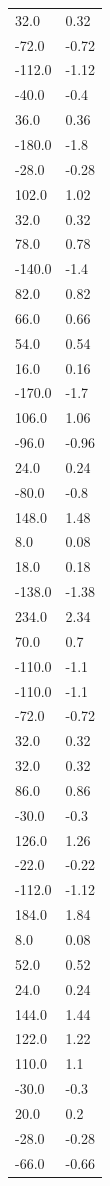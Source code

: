 \begin{longtable}{ll}
32.0 & 0.32 \\
-72.0 & -0.72 \\
-112.0 & -1.12 \\
-40.0 & -0.4 \\
36.0 & 0.36 \\
-180.0 & -1.8 \\
-28.0 & -0.28 \\
102.0 & 1.02 \\
32.0 & 0.32 \\
78.0 & 0.78 \\
-140.0 & -1.4 \\
82.0 & 0.82 \\
66.0 & 0.66 \\
54.0 & 0.54 \\
16.0 & 0.16 \\
-170.0 & -1.7 \\
106.0 & 1.06 \\
-96.0 & -0.96 \\
24.0 & 0.24 \\
-80.0 & -0.8 \\
148.0 & 1.48 \\
8.0 & 0.08 \\
18.0 & 0.18 \\
-138.0 & -1.38 \\
234.0 & 2.34 \\
70.0 & 0.7 \\
-110.0 & -1.1 \\
-110.0 & -1.1 \\
-72.0 & -0.72 \\
32.0 & 0.32 \\
32.0 & 0.32 \\
86.0 & 0.86 \\
-30.0 & -0.3 \\
126.0 & 1.26 \\
-22.0 & -0.22 \\
-112.0 & -1.12 \\
184.0 & 1.84 \\
8.0 & 0.08 \\
52.0 & 0.52 \\
24.0 & 0.24 \\
144.0 & 1.44 \\
122.0 & 1.22 \\
110.0 & 1.1 \\
-30.0 & -0.3 \\
20.0 & 0.2 \\
-28.0 & -0.28 \\
-66.0 & -0.66 \\

\end{longtable}
